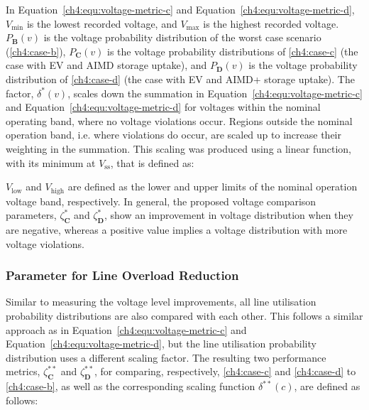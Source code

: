 In Equation~\ref{ch4:equ:voltage-metric-c} and Equation~\ref{ch4:equ:voltage-metric-d}, $V_\text{min}$ is the lowest recorded voltage, and $V_\text{max}$ is the highest recorded voltage.
$P_\textbf{B}(v)$ is the voltage probability distribution of the worst case scenario (\ref{ch4:case-b}), $P_\textbf{C}(v)$ is the voltage probability distributions of \ref{ch4:case-c} (the case with EV and AIMD storage uptake), and $P_\textbf{D}(v)$ is the voltage probability distribution of \ref{ch4:case-d} (the case with EV and AIMD+ storage uptake).
The factor, $\delta^{*}(v)$, scales down the summation in Equation~\ref{ch4:equ:voltage-metric-c} and Equation~\ref{ch4:equ:voltage-metric-d} for voltages within the nominal operating band, where no voltage violations occur.
Regions outside the nominal operation band, i.e. where violations do occur, are scaled up to increase their weighting in the summation.
This scaling was produced using a linear function, with its minimum at $V_\text{ss}$, that is defined as:



$V_\text{low}$ and $V_\text{high}$ are defined as the lower and upper limits of the nominal operation voltage band, respectively.
In general, the proposed voltage comparison parameters, $\zeta^*_\textbf{C}$ and $\zeta^*_\textbf{D}$, show an improvement in voltage distribution when they are negative, whereas a positive value implies a voltage distribution with more voltage violations.

\subsubsection{Parameter for Line Overload Reduction}

Similar to measuring the voltage level improvements, all line utilisation probability distributions are also compared with each other.
This follows a similar approach as in Equation~\ref{ch4:equ:voltage-metric-c} and Equation~\ref{ch4:equ:voltage-metric-d}, but the line utilisation probability distribution uses a different scaling factor.
The resulting two performance metrics, $\zeta_\textbf{C}^{**}$ and $\zeta_\textbf{D}^{**}$, for comparing, respectively, \ref{ch4:case-c} and   \ref{ch4:case-d} to \ref{ch4:case-b}, as well as the corresponding scaling function $\delta^{**}(c)$, are defined as follows:


